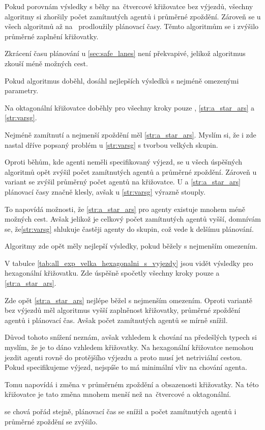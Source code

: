 Pokud porovnám výsledky s běhy na~čtvercové křižovatce bez výjezdů,
všechny algoritmy si zhoršily počet zamítnutých agentů i průměrné zpoždění.
Zároveň se u všech algoritmů až na~ prodloužily plánovací časy.
Těmto algoritmům se i zvýšilo průměrné zaplnění křižovatky.

Zkrácení času plánování u \ref{sec:safe_lanes} není překvapivé, jelikož algoritmus zkouší méně možných cest.

Pokud algoritmus doběhl, dosáhl nejlepších výsledků s nejméně omezenými parametry.



Na oktagonální křižovatce doběhly pro všechny kroky pouze
, \ref{str:a_star_ars} a \ref{str:varsg}.

Nejméně zamítnutí a nejmenší zpoždění měl \ref{str:a_star_ars}.
Myslím si, že i zde nastal dříve popsaný problém u \ref{str:varsg} s tvorbou velkých skupin.

Oproti běhům, kde agenti neměli specifikovaný výjezd,
se u všech úspěšných algoritmů opět zvýšil počet zamítnutých agentů a průměrné zpoždění.
Zároveň u  variant se zvýšil průměrný počet agentů na křižovatce.
U  a \ref{str:a_star_ars} plánovací časy značně klesly,
avšak u \ref{str:varsg} výrazně stouply.

To napovídá možnosti, že \ref{str:a_star_ars} pro agenty existuje mnohem méně možných cest.
Avšak jelikož je celkový počet zamítnutých agentů vyšší, domnívám se,
že\ref{str:varsg} shlukuje častěji agenty do skupin, což vede k delšímu plánování.

Algoritmy zde opět měly nejlepší výsledky, pokud běžely s nejmenším omezením.



V tabulce \ref{tab:all_exp_velka_hexagonalni_s_vyjezdy} jsou vidět výsledky pro hexagonální křižovatku.
Zde úspěšně spočetly všechny kroky pouze  a \ref{str:a_star_ars}.

Zde opět \ref{str:a_star_ars} nejlépe běžel s nejmenším omezením.
Oproti variantě bez výjezdů měl algoritmus vyšší zaplněnost křižovatky, průměrné zpoždění agentů i plánovací čas.
Avšak počet zamítnutých agentů se mírně snížil.

Důvod tohoto snížení neznám, avšak vzhledem k chování na předešlých typech si myslím,
že je to dáno vzhledem křižovatky.
Na hexagonální křižovatce nemohou jezdit agenti rovně do protějšího výjezdu a proto musí jet netriviální cestou.
Pokud specifikujeme výjezd, nejspíše to má minimální vliv na chování agenta.

Tomu napovídá i změna v průměrném zpoždění a obsazenosti křižovatky.
Na této křižovatce je tato změna mnohem menší než na~čtvercové a oktagonální.

 se chová pořád stejně, plánovací čas se snížil a
počet zamítnutých agentů i průměrné zpoždění se zvýšilo.



